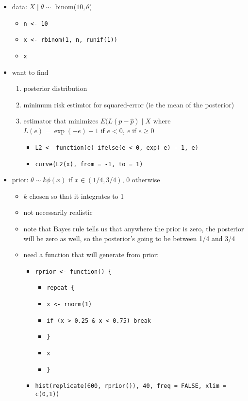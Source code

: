 \documentclass[11pt]{article}
\begin{document}
\begin{itemize}
\item data: $X \mid \theta \sim$ binom($10, \theta$)
\begin{itemize}
\item \texttt{n <- 10}
\item \texttt{x <- rbinom(1, n, runif(1))}
\item \texttt{x}
\end{itemize}
\item want to find
\begin{enumerate}
\item posterior distribution
\item minimum risk estimtor for squared-error (ie the mean of the posterior)
\item estimator that minimizes $E(L(p - \hat p) \mid X$ where
          $L(e) = \exp(-e) - 1$ if $e < 0$, \emph{e} if $e \geq 0$
\begin{itemize}
\item \texttt{L2 <- function(e) ifelse(e < 0, exp(-e) - 1, e)}
\item \texttt{curve(L2(x), from = -1, to = 1)}
\end{itemize}
\end{enumerate}
\item prior: $\theta \sim k \phi(x)$ if $x \in (1/4, 3/4)$, 0 otherwise
\begin{itemize}
\item $k$ chosen so that it integrates to 1
\item not necessarily realistic
\item note that Bayes rule tells us that anywhere the prior is zero,
         the posterior will be zero as well, so the posterior's going to be 
         between 1/4 and 3/4
\item need a function that will generate from prior:
\begin{itemize}
\item \texttt{rprior <- function() \{}
\begin{itemize}
\item \texttt{repeat \{}
\item \texttt{x <- rnorm(1)}
\item \texttt{if (x > 0.25 \& x < 0.75) break}
\item \texttt{\}}
\item \texttt{x}
\item \texttt{\}}
\end{itemize}
\item \texttt{hist(replicate(600, rprior()), 40, freq = FALSE, xlim = c(0,1))}

\end{itemize}
\end{itemize}
\end{itemize}
\end{document}
